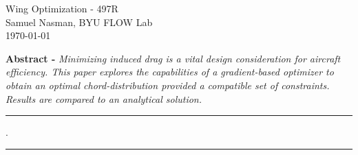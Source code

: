 \documentclass[11pt]{article}
\begin{document}
\centering
\LARGE{Wing Optimization - 497R}\\
\normalsize
\vspace{5pt} Samuel Nasman, BYU FLOW Lab \\
\vspace{5pt} \longdate \today \\


\vspace{10pt}

\begin{minipage}{14cm}
    \centering
    \textbf{Abstract - } \textit{Minimizing induced drag is a vital design consideration for aircraft efficiency. This paper explores the capabilities of a gradient-based optimizer to obtain an optimal chord-distribution provided a compatible set of constraints. Results are compared to an analytical solution. }
\end{minipage}

\rule{0.2\textwidth}{0.5pt} . \rule{0.2\textwidth}{0.5pt}
\end{document}
